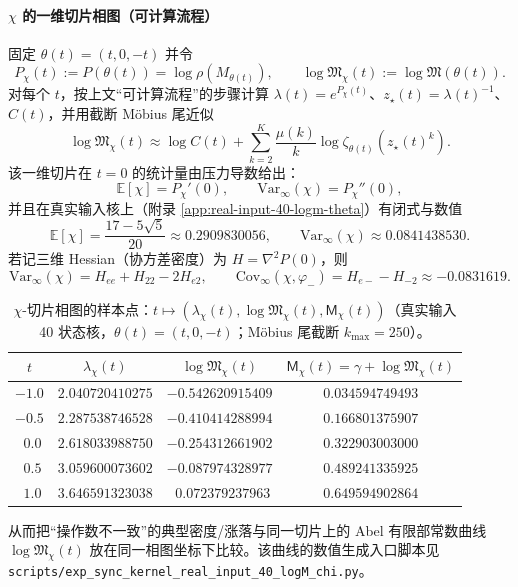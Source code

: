 \paragraph{\texorpdfstring{$\chi$}{chi} 的一维切片相图（可计算流程）}
固定
\(
\theta(t)=(t,0,-t)
\)
并令
\[
P_\chi(t):=P(\theta(t))=\log\rho(M_{\theta(t)}),
\qquad
\log\mathfrak{M}_\chi(t):=\log\mathfrak{M}(\theta(t)).
\]
对每个 $t$，按上文“可计算流程”的步骤计算 $\lambda(t)=e^{P_\chi(t)}$、$z_\star(t)=\lambda(t)^{-1}$、$C(t)$，并用截断 Möbius 尾近似
\[
\log\mathfrak{M}_\chi(t)\approx \log C(t)+\sum_{k=2}^{K}\frac{\mu(k)}{k}\log\zeta_{\theta(t)}(z_\star(t)^k).
\]
该一维切片在 $t=0$ 的统计量由压力导数给出：
\[
\mathbb{E}[\chi]=P_\chi'(0),\qquad \mathrm{Var}_\infty(\chi)=P_\chi''(0),
\]
并且在真实输入核上（附录 \ref{app:real-input-40-logm-theta}）有闭式与数值
\[
\mathbb{E}[\chi]=\frac{17-5\sqrt5}{20}\approx 0.2909830056,
\qquad
\mathrm{Var}_\infty(\chi)\approx 0.0841438530.
\]
若记三维 Hessian（协方差密度）为 $H=\nabla^2P(0)$，则
\[
\mathrm{Var}_\infty(\chi)=H_{ee}+H_{22}-2H_{e2},
\qquad
\mathrm{Cov}_\infty(\chi,\varphi_-)=H_{e-}-H_{-2}\approx -0.0831619.
\]
\begin{table}[H]
\centering
\scriptsize
\setlength{\tabcolsep}{8pt}
\renewcommand{\arraystretch}{1.15}
\caption{$\chi$-切片相图的样本点：$t\mapsto(\lambda_\chi(t),\log\mathfrak{M}_\chi(t),\mathsf{M}_\chi(t))$（真实输入 40 状态核，$\theta(t)=(t,0,-t)$；Möbius 尾截断 $k_{\max}=250$）。}
\label{tab:real-input-40-logM-chi-sample}
\begin{tabular}{@{}cccc@{}}
\toprule
$t$ & $\lambda_\chi(t)$ & $\log\mathfrak{M}_\chi(t)$ & $\mathsf{M}_\chi(t)=\gamma+\log\mathfrak{M}_\chi(t)$ \\
\midrule
$-1.0$ & $2.040720410275$ & $-0.542620915409$ & $0.034594749493$ \\
$-0.5$ & $2.287538746528$ & $-0.410414288994$ & $0.166801375907$ \\
$\ \ 0.0$ & $2.618033988750$ & $-0.254312661902$ & $0.322903003000$ \\
$\ \ 0.5$ & $3.059600073602$ & $-0.087974328977$ & $0.489241335925$ \\
$\ \ 1.0$ & $3.646591323038$ & $\ \ 0.072379237963$ & $0.649594902864$ \\
\bottomrule
\end{tabular}
\end{table}

从而把“操作数不一致”的典型密度/涨落与同一切片上的 Abel 有限部常数曲线 $\log\mathfrak{M}_\chi(t)$ 放在同一相图坐标下比较。该曲线的数值生成入口脚本见
\texttt{scripts/exp\_sync\_kernel\_real\_input\_40\_logM\_chi.py}。
